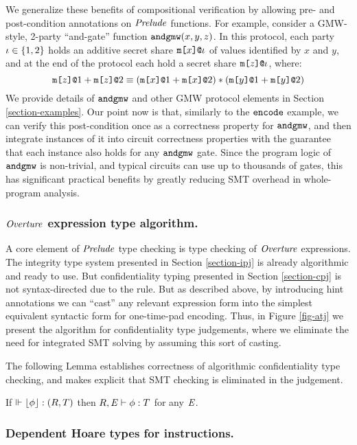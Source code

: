 We generalize these benefits of compositional verification by allowing
pre- and post-condition annotations on $\mathit{Prelude}$ functions. For
example, consider a GMW-style, 2-party ``and-gate'' function
$\texttt{andgmw}(x,y,z)$. In this protocol, each party $\iota
\in \{1,2\}$ holds an additive secret share $\texttt{m[}x\texttt{]}\texttt{@}\iota$ of
values identified by $x$ and $y$, and at the end of the
protocol each hold a secret share $\texttt{m[}z\texttt{]}\texttt{@}\iota$, where:
$$
\texttt{m[}z\texttt{]}\texttt{@}1 + \texttt{m[}z\texttt{]}\texttt{@}2 \equiv (\texttt{m[}x\texttt{]}\texttt{@}1 + \texttt{m[}x\texttt{]}\texttt{@}2) * (\texttt{m[}y\texttt{]}\texttt{@}1 + \texttt{m[}y\texttt{]}\texttt{@}2)
$$
We provide details of $\texttt{andgmw}$ and other GMW protocol
elements in Section \ref{section-examples}.  Our point now is that,
similarly to the $\texttt{encode}$ example, we can verify this
post-condition once as a correctness property for $\texttt{andgmw}$, and
then integrate instances of it into circuit correctness properties
with the guarantee that each instance also holds for any
$\texttt{andgmw}$ gate.  Since the program logic of $\texttt{andgmw}$ is
non-trivial, and typical circuits can use up to thousands of gates,
this has significant practical benefits by greatly reducing SMT overhead
in whole-program analysis.

\subsubsection{$\mathit{Overture}$ expression type algorithm.}

A core element of $\mathit{Prelude}$ type checking is type checking
of $\mathit{Overture}$ expressions. The integrity type system presented in Section
\ref{section-ipj} is already algorithmic and ready to use. But confidentiality
typing presented in Section \ref{section-cpj} is not syntax-directed
due to the  rule. But as described above, by introducing
hint annotations we can ``cast'' any relevant expression form into
the simplest equivalent syntactic form for one-time-pad encoding.
Thus, in Figure \ref{fig-atj} we present the algorithm for
confidentiality type judgements, where we eliminate the need for
integrated SMT solving by assuming this sort of casting. 

\atjfig

The following Lemma establishes correctness of algorithmic confidentiality
type checking, and makes explicit that SMT checking is eliminated in the
judgement.
\begin{lemma}
  If $\Vdash \lfloor \phi \rfloor : (R,T)$ then $R,\mathit{E} \vdash \phi : T$ for any $\mathit{E}$.
\end{lemma}

\subsubsection{Dependent Hoare types for instructions.}

